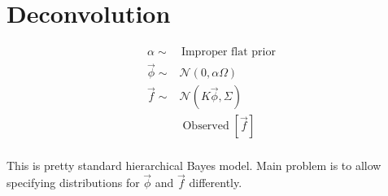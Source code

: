\documentclass[a4paper]{article}
\newcommand{\Observed}{\operatorname{Observed}}
\newcommand{\Normal}{\mathcal{N}}
\begin{document}
\section{Deconvolution}

\begin{equation}
  \begin{aligned}
    \alpha   \sim& \,\mbox{Improper flat prior} \\
    \vec\phi \sim& \Normal(0, \alpha\Omega) \\
    \vec{f}  \sim& \Normal(K\vec\phi, \Sigma) \\
    &\Observed[\vec{f}] \\
  \end{aligned}
\end{equation}

This is pretty standard hierarchical Bayes model. Main problem is to allow
specifying distributions for $\vec\phi$ and $\vec{f}$ differently. 
\end{document}

